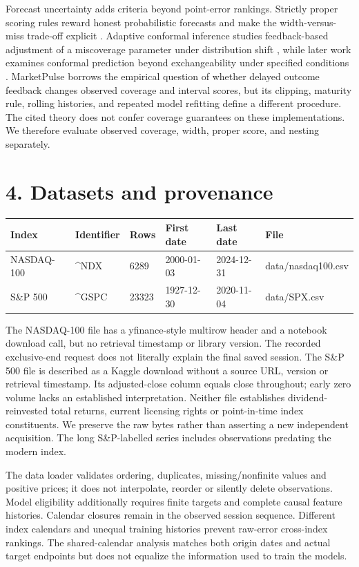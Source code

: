 \documentclass[11pt]{article}
\begin{document}
Forecast uncertainty adds criteria beyond point-error rankings. Strictly proper scoring rules reward honest probabilistic forecasts and make the width-versus-miss trade-off explicit \citep{gneiting2007}. Adaptive conformal inference studies feedback-based adjustment of a miscoverage parameter under distribution shift \citep{gibbs2021}, while later work examines conformal prediction beyond exchangeability under specified conditions \citep{barber2023}. MarketPulse borrows the empirical question of whether delayed outcome feedback changes observed coverage and interval scores, but its clipping, maturity rule, rolling histories, and repeated model refitting define a different procedure. The cited theory does not confer coverage guarantees on these implementations. We therefore evaluate observed coverage, width, proper score, and nesting separately.

\section*{4. Datasets and provenance}

\Needspace{71pt}
\begin{center}{\footnotesize\begin{tabular}{llllll}
\toprule
Index & Identifier & Rows & First date & Last date & File\\
\midrule
NASDAQ-100 & \textasciicircum{}NDX & 6289 & 2000-01-03 & 2024-12-31 & data/nasdaq100.csv\\
S\&P 500 & \textasciicircum{}GSPC & 23323 & 1927-12-30 & 2020-11-04 & data/SPX.csv\\
\bottomrule\end{tabular}}\end{center}

The NASDAQ-100 file has a yfinance-style multirow header and a notebook download call, but no retrieval timestamp or library version. The recorded exclusive-end request does not literally explain the final saved session. The S\&P 500 file is described as a Kaggle download without a source URL, version or retrieval timestamp. Its adjusted-close column equals close throughout; early zero volume lacks an established interpretation. Neither file establishes dividend-reinvested total returns, current licensing rights or point-in-time index constituents. We preserve the raw bytes rather than asserting a new independent acquisition. The long S\&P-labelled series includes observations predating the modern index.

The data loader validates ordering, duplicates, missing/nonfinite values and positive prices; it does not interpolate, reorder or silently delete observations. Model eligibility additionally requires finite targets and complete causal feature histories. Calendar closures remain in the observed session sequence. Different index calendars and unequal training histories prevent raw-error cross-index rankings. The shared-calendar analysis matches both origin dates and actual target endpoints but does not equalize the information used to train the models.
\end{document}
